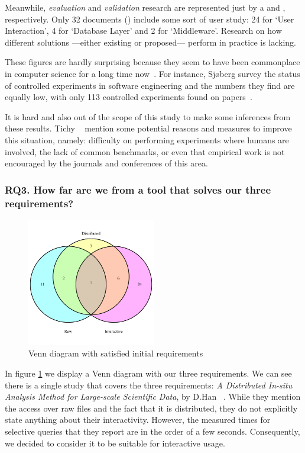 Meanwhile, \emph{evaluation} and \emph{validation} research are represented
just by a  and , respectively.
Only 32 documents () include some sort of user study:
24 for `User Interaction', 4 for `Database  Layer' and 2 for `Middleware'.
Research on how different solutions ---either existing or proposed--- perform in
practice is lacking.

These figures are hardly surprising because they seem to have been commonplace
in computer science for a long time now~\cite{TICHY1995,ZELKOWITZ1997,Sjoberg2005}.
For instance, Sjøberg \etal survey the status of controlled experiments
in software engineering and the numbers they find are equally low, with
only 113 controlled experiments found on  papers~\cite{Sjoberg2005}.

It is hard and also out of the scope of this study to make some inferences from these
results. Tichy \etal~\cite{TICHY1995} mention some potential reasons and measures
to improve this situation, namely: difficulty on performing experiments where humans
are involved, the lack of common benchmarks, or even that empirical work is not
encouraged by the journals and conferences of this area.

\subsubsection{RQ3. How far are we from a tool that solves our three requirements?}

\begin{figure}[htbp]
    \centering
    \includegraphics[width=0.5\textwidth]{images/3_mapping/venn}
    \caption{Venn diagram with satisfied initial requirements}
    \label{fig:mapping/venn_requirements}
\end{figure}

In figure \ref{fig:mapping/venn_requirements} we display a Venn diagram with our three
requirements. We can see there is a single study that covers the three requirements:
\textit{{A} {D}istributed {I}n-situ {A}nalysis {M}ethod for {L}arge-scale
{S}cientific {D}ata}, by D.Han \etal~\cite{Han2017}. While they mention the
access over raw files and the fact that it is distributed, they do not
explicitly state anything about their interactivity. However, the measured times
for selective queries that they report are in the order of a few seconds. Consequently, we
decided to consider it to be suitable for interactive usage.

